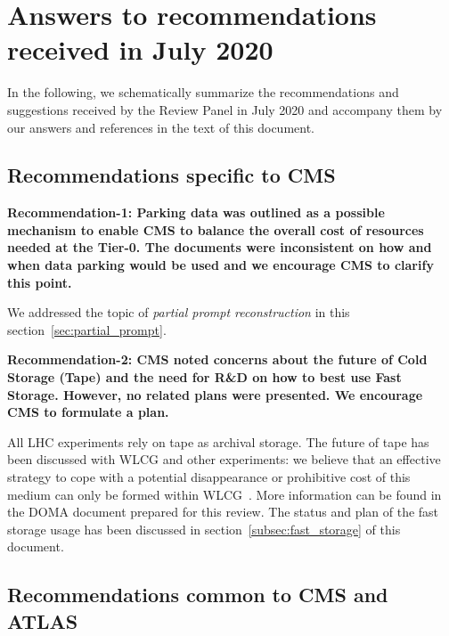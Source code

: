 \documentclass{cmspaper}
\newcommand{\B}[1]{\textbf{#1}}
\begin{document}
\newpage
\appendix


\newpage
\section{Answers to recommendations received in July 2020}
In the following, we schematically summarize the recommendations and suggestions received by the Review Panel in July 2020 and accompany them by our answers and references in the text of this document.

\subsection{Recommendations specific to CMS}
\B{Recommendation-1: Parking data was outlined as a possible mechanism to enable CMS to balance the overall cost of resources needed at the Tier-0. The documents were inconsistent on how and when data parking would be used and we encourage CMS to clarify this point.}

We addressed the topic of \textit{partial prompt reconstruction} in this section~\ref{sec:partial_prompt}.

\B{Recommendation-2: CMS noted concerns about the future of Cold Storage (Tape) and the need for R\&D on how to best use Fast Storage. However, no related plans were presented. We encourage CMS to formulate a plan.}

All LHC experiments rely on tape as archival storage. The future of tape has been discussed with WLCG and other experiments: we believe that an effective strategy to cope with a potential disappearance or prohibitive cost of this medium can only be formed within WLCG~\cite{Ahn_HSF}. More information can be found in the DOMA document prepared for this review. The status and plan of the fast storage usage has been discussed in section~\ref{subsec:fast_storage} of this document.

\subsection{Recommendations common to CMS and ATLAS}
\end{document}
